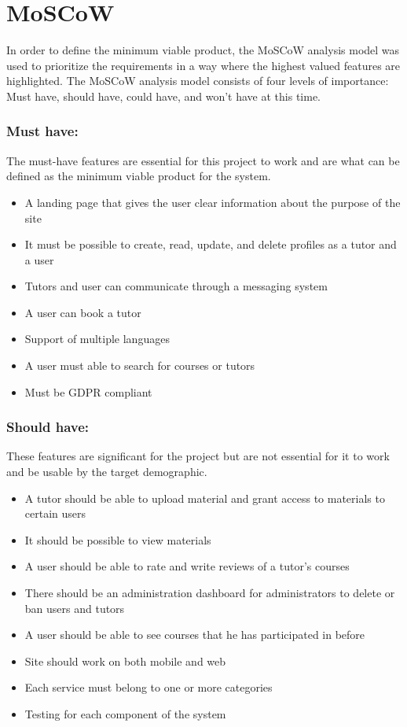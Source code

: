 \section{MoSCoW}
In order to define the minimum viable product, the MoSCoW analysis model was used to prioritize the requirements in a way where the highest valued features are highlighted.
The MoSCoW analysis model consists of four levels of importance: Must have, should have, could have, and won't have at this time.

\subsubsection{Must have:}
The must-have features are essential for this project to work and are what can be defined as the minimum viable product for the system.

\begin{itemize}
    \item A landing page that gives the user clear information about the purpose of the site
    \item It must be possible to create, read, update, and delete profiles as a tutor and a user
    \item Tutors and user can communicate through a messaging system
    \item A user can book a tutor
    \item Support of multiple languages
    \item A user must able to search for courses or tutors
    \item Must be GDPR compliant
\end{itemize}

\subsubsection{Should have:}
These features are significant for the project but are not essential for it to work and be usable by the target demographic.

\begin{itemize}
    \item A tutor should be able to upload material and grant access to materials to certain users
    \item It should be possible to view materials
    \item A user should be able to rate and write reviews of a tutor's courses
    \item There should be an administration dashboard for administrators to delete or ban users and tutors
    \item A user should be able to see courses that he has participated in before
    \item Site should work on both mobile and web
    \item Each service must belong to one or more categories
    \item Testing for each component of the system
\end{itemize}


